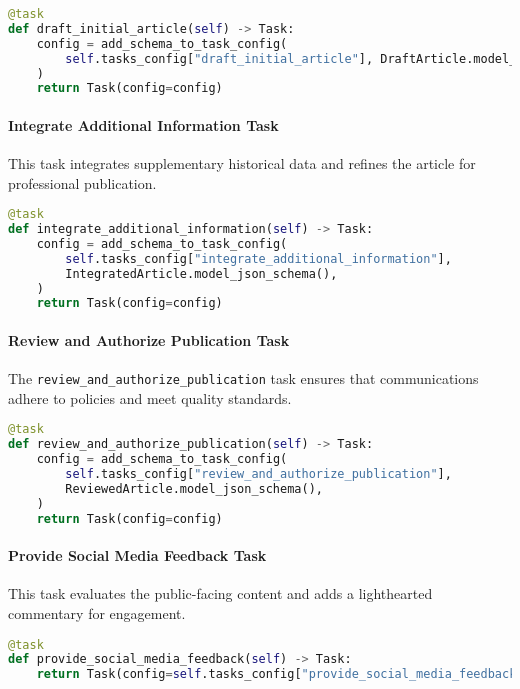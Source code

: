 \begin{lstlisting}[language=Python]
@task
def draft_initial_article(self) -> Task:
    config = add_schema_to_task_config(
        self.tasks_config["draft_initial_article"], DraftArticle.model_json_schema()
    )
    return Task(config=config)
\end{lstlisting}

\paragraph{Integrate Additional Information Task}
This task integrates supplementary historical data and refines the article for professional publication.

\begin{lstlisting}[language=Python]
@task
def integrate_additional_information(self) -> Task:
    config = add_schema_to_task_config(
        self.tasks_config["integrate_additional_information"],
        IntegratedArticle.model_json_schema(),
    )
    return Task(config=config)
\end{lstlisting}

\paragraph{Review and Authorize Publication Task}
The \texttt{review\_and\_authorize\_publication} task ensures that communications adhere to policies and meet quality standards.

\begin{lstlisting}[language=Python]
@task
def review_and_authorize_publication(self) -> Task:
    config = add_schema_to_task_config(
        self.tasks_config["review_and_authorize_publication"],
        ReviewedArticle.model_json_schema(),
    )
    return Task(config=config)
\end{lstlisting}

\paragraph{Provide Social Media Feedback Task}
This task evaluates the public-facing content and adds a lighthearted commentary for engagement.

\begin{lstlisting}[language=Python]
@task
def provide_social_media_feedback(self) -> Task:
    return Task(config=self.tasks_config["provide_social_media_feedback"])
\end{lstlisting}

